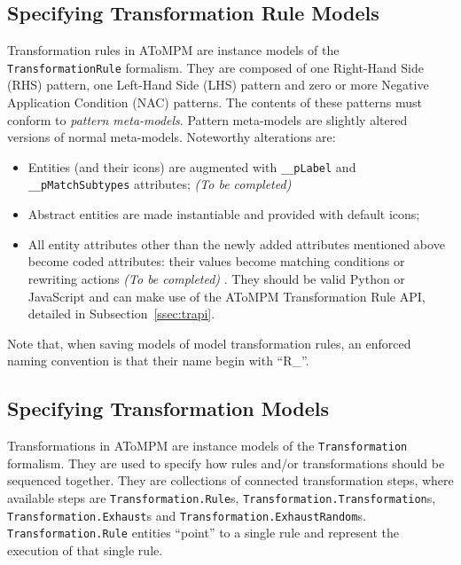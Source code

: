 \documentclass{article}
\numberwithin{equation}{section}
\numberwithin{figure}{section}
\newcommand{\TBC}{\textit{(To be completed) }}
\begin{document}
\subsection{Specifying Transformation Rule Models}
\label{ssec:trmm}
Transformation rules in AToMPM are instance models of the \texttt{TransformationRule} formalism. They are composed of one Right-Hand Side (RHS) pattern, one Left-Hand Side (LHS) pattern and zero or more Negative Application Condition (NAC) patterns. The contents of these patterns must conform to \textit{pattern meta-models}. Pattern meta-models are slightly altered versions of normal meta-models. Noteworthy alterations are:
\begin{itemize}
	\item Entities (and their icons) are augmented with \texttt{\_\_pLabel} and \texttt{\_\_pMatchSubtypes} attributes; \TBC
	\item Abstract entities are made instantiable and provided with default icons;
	\item All entity attributes other than the newly added attributes mentioned above become coded attributes: their values become matching conditions or rewriting actions \TBC. They should be valid Python or JavaScript and can make use of the AToMPM Transformation Rule API, detailed in  Subsection~\ref{ssec:trapi}.	
\end{itemize}

Note that, when saving models of model transformation rules, an enforced naming convention is that their name begin with ``R\_''.



\subsection{Specifying Transformation Models}
\label{ssec:tmm}
Transformations in AToMPM are instance models of the \texttt{Transformation} formalism. They are used to specify how rules and/or transformations should be sequenced together. They are collections of connected transformation steps, where available steps are \texttt{Transformation.Rule}s, \texttt{Transformation.Transformation}s, \texttt{Transformation.Exhaust}s and \texttt{Transformation.ExhaustRandom}s.\\

\texttt{Transformation.Rule} entities ``point'' to a single rule and represent the execution of that single rule.\\
\end{document}
